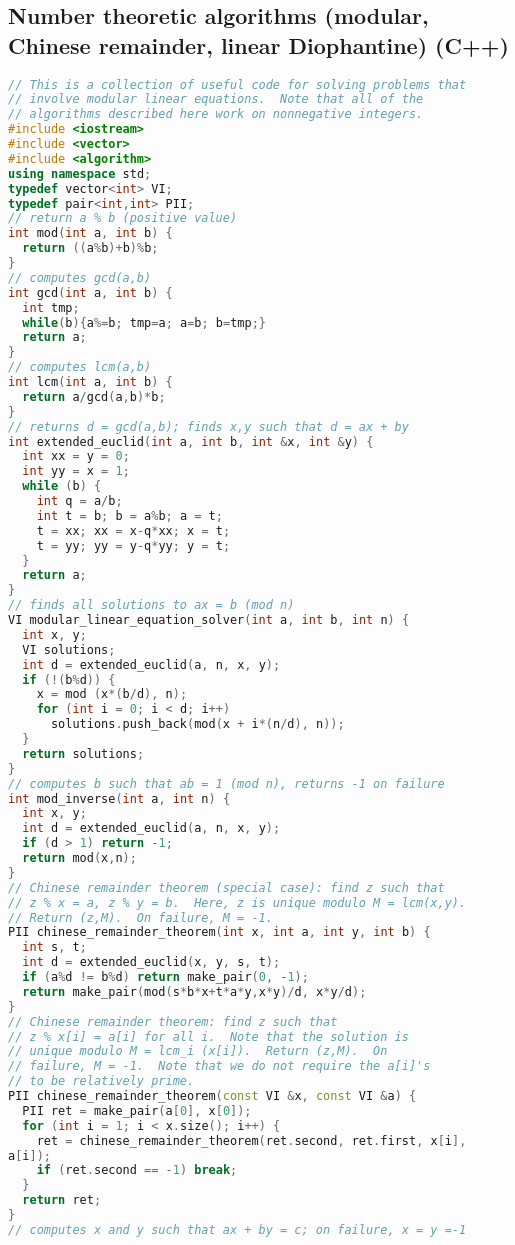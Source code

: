\subsection{Number theoretic algorithms (modular, Chinese 
remainder, linear Diophantine) (C++)}
\begin{lstlisting}[language=C++]
// This is a collection of useful code for solving problems that
// involve modular linear equations.  Note that all of the
// algorithms described here work on nonnegative integers.
#include <iostream>
#include <vector>
#include <algorithm>
using namespace std;
typedef vector<int> VI;
typedef pair<int,int> PII;
// return a % b (positive value)
int mod(int a, int b) {
  return ((a%b)+b)%b;
}
// computes gcd(a,b)
int gcd(int a, int b) {
  int tmp;
  while(b){a%=b; tmp=a; a=b; b=tmp;}
  return a;
}
// computes lcm(a,b)
int lcm(int a, int b) {
  return a/gcd(a,b)*b;
}
// returns d = gcd(a,b); finds x,y such that d = ax + by
int extended_euclid(int a, int b, int &x, int &y) {  
  int xx = y = 0;
  int yy = x = 1;
  while (b) {
    int q = a/b;
    int t = b; b = a%b; a = t;
    t = xx; xx = x-q*xx; x = t;
    t = yy; yy = y-q*yy; y = t;
  }
  return a;
}
// finds all solutions to ax = b (mod n)
VI modular_linear_equation_solver(int a, int b, int n) {
  int x, y;
  VI solutions;
  int d = extended_euclid(a, n, x, y);
  if (!(b%d)) {
    x = mod (x*(b/d), n);
    for (int i = 0; i < d; i++)
      solutions.push_back(mod(x + i*(n/d), n));
  }
  return solutions;
}
// computes b such that ab = 1 (mod n), returns -1 on failure
int mod_inverse(int a, int n) {
  int x, y;
  int d = extended_euclid(a, n, x, y);
  if (d > 1) return -1;
  return mod(x,n);
}
// Chinese remainder theorem (special case): find z such that
// z % x = a, z % y = b.  Here, z is unique modulo M = lcm(x,y).
// Return (z,M).  On failure, M = -1.
PII chinese_remainder_theorem(int x, int a, int y, int b) {
  int s, t;
  int d = extended_euclid(x, y, s, t);
  if (a%d != b%d) return make_pair(0, -1);
  return make_pair(mod(s*b*x+t*a*y,x*y)/d, x*y/d);
}
// Chinese remainder theorem: find z such that
// z % x[i] = a[i] for all i.  Note that the solution is
// unique modulo M = lcm_i (x[i]).  Return (z,M).  On 
// failure, M = -1.  Note that we do not require the a[i]'s
// to be relatively prime.
PII chinese_remainder_theorem(const VI &x, const VI &a) {
  PII ret = make_pair(a[0], x[0]);
  for (int i = 1; i < x.size(); i++) {
    ret = chinese_remainder_theorem(ret.second, ret.first, x[i], 
a[i]);
    if (ret.second == -1) break;
  }
  return ret;
}
// computes x and y such that ax + by = c; on failure, x = y =-1

\end{lstlisting}
